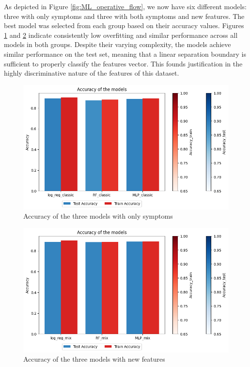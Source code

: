 As depicted in Figure \ref{fig:ML_operative_flow}, we now have six different models: three with only symptoms 
and three with both symptoms and new features. The best model was selected from each group based on their accuracy 
values. Figures \ref{fig:acc_symptoms} and \ref{fig:acc_new_features} indicate consistently low overfitting 
and similar performance across all models in both groups. Despite their varying complexity, the models achieve 
similar performance on the test set, meaning that a linear separation boundary is sufficient to properly classify
the features vector. This founds justification in the highly discriminative nature of the features of this dataset.

\begin{figure}[H]
	\centering
	\includegraphics[width=\columnwidth]{images/acc_symptoms.png}
	\caption{Accuracy of the three models with only symptoms}
	\label{fig:acc_symptoms}
\end{figure}

\begin{figure}[H]
	\centering
	\includegraphics[width=\columnwidth]{images/acc_new_features.png}
	\caption{Accuracy of the three models with new features}
	\label{fig:acc_new_features}
\end{figure}



